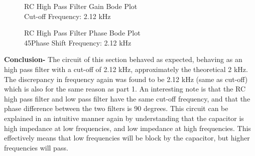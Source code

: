 \documentclass[12pt]{article}
\begin{document}
\begin{figure}[h!]
\begin{center}
    	\resizebox{0.6\textwidth}{!}{}
\end{center}
\caption{RC High Pass Filter Gain Bode Plot \\ Cut-off Frequency: 2.12 kHz}
\end{figure}
\begin{figure}[h!]
\begin{center}
    	\resizebox{0.6\textwidth}{!}{}
\end{center}
\caption{RC High Pass Filter Phase Bode Plot \\ 45\textdegree\space Phase Shift Frequency: 2.12 kHz}
\end{figure}
\FloatBarrier
\textbf{Conclusion-} The circuit of this section behaved as expected, behaving as an high pass filter with a cut-off of 2.12 kHz, approximately the theoretical 2 kHz. The discrepancy in frequency again was found to be 2.12 kHz (same as cut-off) which is also for the same reason as part 1. An interesting note is that the RC high pass filter and low pass filter have the same cut-off frequency, and that the phase difference between the two filters is 90 degrees. This circuit can be explained in an intuitive manner again by understanding that the capacitor is high impedance at low frequencies, and low impedance at high frequencies. This effectively means that low frequencies will be block by the capacitor, but higher frequencies will pass.
\end{document}
